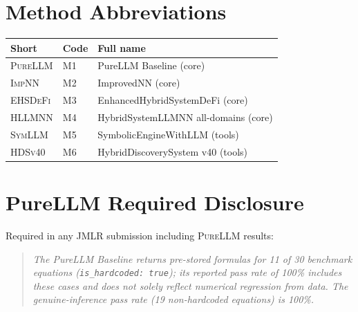 \documentclass[twoside,11pt]{article}
\newcommand{\PureLLM}{\textsc{PureLLM}}
\newcommand{\INN}{\textsc{ImpNN}}
\newcommand{\EHD}{\textsc{EHSDeFi}}
\newcommand{\HSL}{\textsc{HLLMNN}}
\newcommand{\SEL}{\textsc{SymLLM}}
\newcommand{\HDS}{\textsc{HDSv40}}
\begin{document}
\section{Method Abbreviations}
\label{app:abbrev}

\begin{tabular}{L{1.8cm} L{2.5cm} L{6.0cm}}
\toprule
\textbf{Short} & \textbf{Code} & \textbf{Full name}\\
\midrule
\PureLLM & M1 & PureLLM Baseline (core)\\
\INN     & M2 & ImprovedNN (core)\\
\EHD     & M3 & EnhancedHybridSystemDeFi (core)\\
\HSL     & M4 & HybridSystemLLMNN all-domains (core)\\
\SEL     & M5 & SymbolicEngineWithLLM (tools)\\
\HDS     & M6 & HybridDiscoverySystem v40 (tools)\\
\bottomrule
\end{tabular}

\section{PureLLM Required Disclosure}
\label{app:disclosure}

Required in any JMLR submission including \PureLLM{} results:

\begin{quote}
\textit{The PureLLM Baseline returns pre-stored formulas for 11 of 30
benchmark equations (\texttt{is\_hardcoded: true}); its reported pass rate
of 100\% includes these cases and does not solely reflect numerical
regression from data.  The genuine-inference pass rate (19 non-hardcoded
equations) is 100\%.}
\end{quote}
\end{document}
